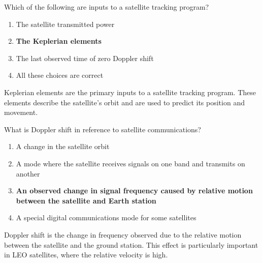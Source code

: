 
\begin{tcolorbox}[colback=gray!10!white,colframe=black!75!black,title={T8B06}]
    Which of the following are inputs to a satellite tracking program?
    \begin{enumerate}[label=\Alph*,noitemsep]
        \item The satellite transmitted power
        \item \textbf{The Keplerian elements}
        \item The last observed time of zero Doppler shift
        \item All these choices are correct
    \end{enumerate}
\end{tcolorbox}
Keplerian elements are the primary inputs to a satellite tracking program. These elements describe the satellite's orbit and are used to predict its position and movement.


\begin{tcolorbox}[colback=gray!10!white,colframe=black!75!black,title={T8B07}]
    What is Doppler shift in reference to satellite communications?
    \begin{enumerate}[label=\Alph*,noitemsep]
        \item A change in the satellite orbit
        \item A mode where the satellite receives signals on one band and transmits on another
        \item \textbf{An observed change in signal frequency caused by relative motion between the satellite and Earth station}
        \item A special digital communications mode for some satellites
    \end{enumerate}
\end{tcolorbox}
Doppler shift is the change in frequency observed due to the relative motion between the satellite and the ground station. This effect is particularly important in LEO satellites, where the relative velocity is high.


